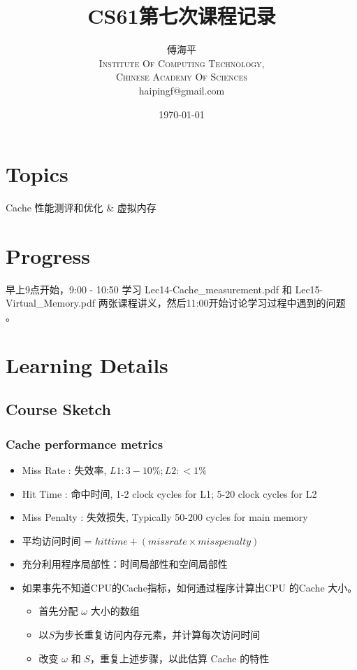 \documentclass[a4paper, 11pt]{article}
\title{CS61第七次课程记录}
\author{傅海平\\
\textsc{Institute Of Computing Technology,}\\
\textsc{Chinese Academy Of Sciences}\\
haipingf@gmail.com\\
}
\date{\today}
\begin{document}
\maketitle
\newpage
\tableofcontents
\newpage
\section{Topics}
\begin{center}
  \Large{Cache 性能测评和优化 \& 虚拟内存}
\end{center}

\section{Progress}
早上9点开始，9:00 - 10:50 学习 Lec14-Cache\_measurement.pdf 和
Lec15-Virtual\_Memory.pdf 两张课程讲义，然后11:00开始讨论学习过程中遇到的问题
。
\section{Learning Details}
\subsection{Course Sketch}
\subsubsection{Cache performance metrics}
\begin{itemize}
  \item{Miss Rate : 失效率, $L1: 3-10\%; L2: < 1\%$}
  \item{Hit Time  : 命中时间, 1-2 clock cycles for L1; 5-20 clock cycles for L2}
  \item{Miss Penalty : 失效损失, Typically 50-200 cycles for main memory}
  \item{平均访问时间 = $hit time + (miss rate \times miss penalty)$}
  \item{充分利用程序局部性：时间局部性和空间局部性}
  \item{如果事先不知道CPU的Cache指标，如何通过程序计算出CPU 的Cache 大小。}
	\begin{itemize}
	  \item{首先分配 $\omega$ 大小的数组}
	  \item{以$S$为步长重复访问内存元素，并计算每次访问时间}
	  \item{改变 $\omega$ 和 $S$，重复上述步骤，以此估算 Cache 的特性}
	  \end{itemize}
  \end{itemize}
\end{document}
